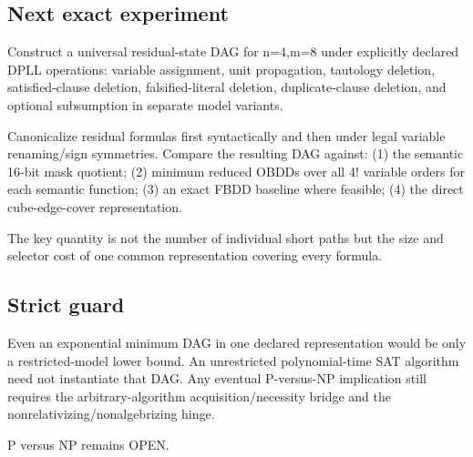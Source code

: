 \subsection*{Next exact experiment}
Construct a universal residual-state DAG for n=4,m=8 under explicitly declared DPLL operations:
variable assignment, unit propagation, tautology deletion, satisfied-clause deletion, falsified-literal deletion, duplicate-clause deletion, and optional subsumption in separate model variants.

Canonicalize residual formulas first syntactically and then under legal variable renaming/sign symmetries. Compare the resulting DAG against:
(1) the semantic 16-bit mask quotient;
(2) minimum reduced OBDDs over all 4! variable orders for each semantic function;
(3) an exact FBDD baseline where feasible;
(4) the direct cube-edge-cover representation.

The key quantity is not the number of individual short paths but the size and selector cost of one common representation covering every formula.

\subsection*{Strict guard}
Even an exponential minimum DAG in one declared representation would be only a restricted-model lower bound. An unrestricted polynomial-time SAT algorithm need not instantiate that DAG. Any eventual P-versus-NP implication still requires the arbitrary-algorithm acquisition/necessity bridge and the nonrelativizing/nonalgebrizing hinge.

P versus NP remains OPEN.

